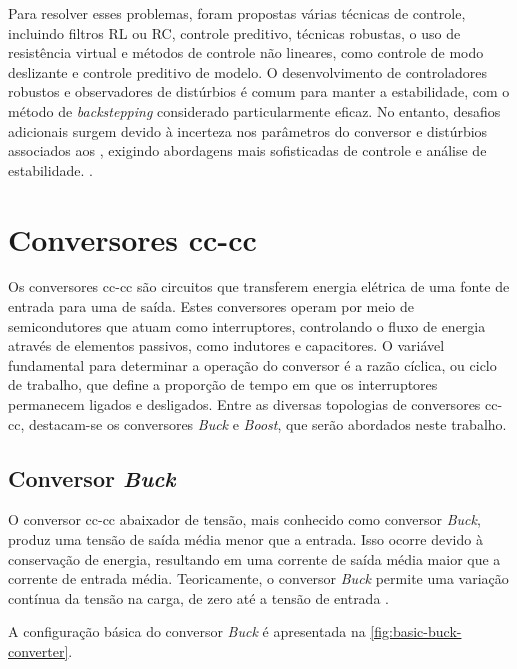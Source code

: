 Para resolver esses problemas, foram propostas várias técnicas de controle, incluindo filtros RL ou RC, controle preditivo, técnicas robustas, o uso de resistência virtual e métodos de controle não lineares, como controle de modo deslizante e controle preditivo de modelo. O desenvolvimento de controladores robustos e observadores de distúrbios é comum para manter a estabilidade, com o método de \textit{backstepping} considerado particularmente eficaz. No entanto, desafios adicionais surgem devido à incerteza nos parâmetros do conversor e distúrbios associados aos , exigindo abordagens mais sofisticadas de controle e análise de estabilidade. \citep{Bessa2020, Amiri2020}.

\section{Conversores \acrshort{cc}-\acrshort{cc}}

Os conversores \acrshort{cc}-\acrshort{cc} são circuitos que transferem energia elétrica de uma fonte de entrada para uma de saída. Estes conversores operam por meio de semicondutores que atuam como interruptores, controlando o fluxo de energia através de elementos passivos, como indutores e capacitores. O variável fundamental para determinar a operação do conversor é a razão cíclica, ou ciclo de trabalho, que define a proporção de tempo em que os interruptores permanecem ligados e desligados. Entre as diversas topologias de conversores \acrshort{cc}-\acrshort{cc}, destacam-se os conversores \textit{Buck} e \textit{Boost}, que serão abordados neste trabalho.

\subsection{Conversor \textit{Buck}} \label{section:buck_converter}

O conversor \acrshort{cc}-\acrshort{cc} abaixador de tensão, mais conhecido como conversor \textit{Buck}, produz uma tensão de saída média menor que a entrada. Isso ocorre devido à conservação de energia, resultando em uma corrente de saída média maior que a corrente de entrada média. Teoricamente, o conversor \textit{Buck} permite uma variação contínua da tensão na carga, de zero até a tensão de entrada \citep{martins2008}.

A configuração básica do conversor \textit{Buck} é apresentada na \autoref{fig:basic-buck-converter}.

